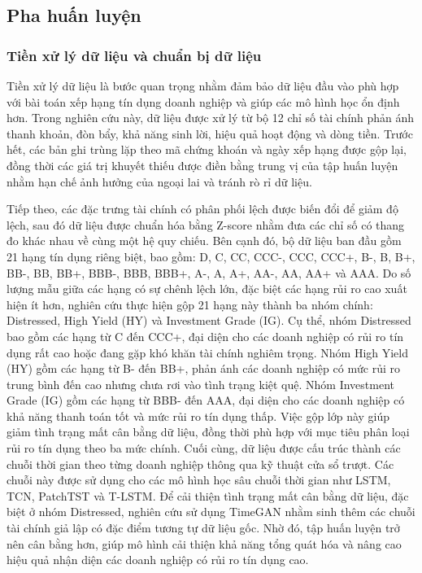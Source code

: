 \documentclass[10pt,twoside]{article}
\begin{document}
\subsection{Pha huấn luyện} 
\subsubsection{Tiền xử lý dữ liệu và chuẩn bị dữ liệu} 
Tiền xử lý dữ liệu là bước quan trọng nhằm đảm bảo dữ liệu đầu vào phù hợp với bài toán xếp hạng tín dụng doanh nghiệp và giúp các mô hình học ổn định hơn. Trong nghiên cứu này, dữ liệu được xử lý từ bộ 12 chỉ số tài chính phản ánh thanh khoản, đòn bẩy, khả năng sinh lời, hiệu quả hoạt động và dòng tiền. Trước hết, các bản ghi trùng lặp theo mã chứng khoán và ngày xếp hạng được gộp lại, đồng thời các giá trị khuyết thiếu được điền bằng trung vị của tập huấn luyện nhằm hạn chế ảnh hưởng của ngoại lai và tránh rò rỉ dữ liệu.

Tiếp theo, các đặc trưng tài chính có phân phối lệch được biến đổi để giảm độ lệch, sau đó dữ liệu được chuẩn hóa bằng Z-score nhằm đưa các chỉ số có thang đo khác nhau về cùng một hệ quy chiếu. Bên cạnh đó, bộ dữ liệu ban đầu gồm 21 hạng tín dụng riêng biệt, bao gồm: D, C, CC, CCC-, CCC, CCC+, B-, B, B+, BB-, BB, BB+, BBB-, BBB, BBB+, A-, A, A+, AA-, AA, AA+ và AAA. Do số lượng mẫu giữa các hạng có sự chênh lệch lớn, đặc biệt các hạng rủi ro cao xuất hiện ít hơn, nghiên cứu thực hiện gộp 21 hạng này thành ba nhóm chính: Distressed, High Yield (HY) và Investment Grade (IG). Cụ thể, nhóm Distressed bao gồm các hạng từ C đến CCC+, đại diện cho các doanh nghiệp có rủi ro tín dụng rất cao hoặc đang gặp khó khăn tài chính nghiêm trọng. Nhóm High Yield (HY) gồm các hạng từ B- đến BB+, phản ánh các doanh nghiệp có mức rủi ro trung bình đến cao nhưng chưa rơi vào tình trạng kiệt quệ. Nhóm Investment Grade (IG) gồm các hạng từ BBB- đến AAA, đại diện cho các doanh nghiệp có khả năng thanh toán tốt và mức rủi ro tín dụng thấp. Việc gộp lớp này giúp giảm tình trạng mất cân bằng dữ liệu, đồng thời phù hợp với mục tiêu phân loại rủi ro tín dụng theo ba mức chính. Cuối cùng, dữ liệu được cấu trúc thành các chuỗi thời gian theo từng doanh nghiệp thông qua kỹ thuật cửa sổ trượt. Các chuỗi này được sử dụng cho các mô hình học sâu chuỗi thời gian như LSTM, TCN, PatchTST và T-LSTM. Để cải thiện tình trạng mất cân bằng dữ liệu, đặc biệt ở nhóm Distressed, nghiên cứu sử dụng TimeGAN nhằm sinh thêm các chuỗi tài chính giả lập có đặc điểm tương tự dữ liệu gốc. Nhờ đó, tập huấn luyện trở nên cân bằng hơn, giúp mô hình cải thiện khả năng tổng quát hóa và nâng cao hiệu quả nhận diện các doanh nghiệp có rủi ro tín dụng cao.
\end{document}
